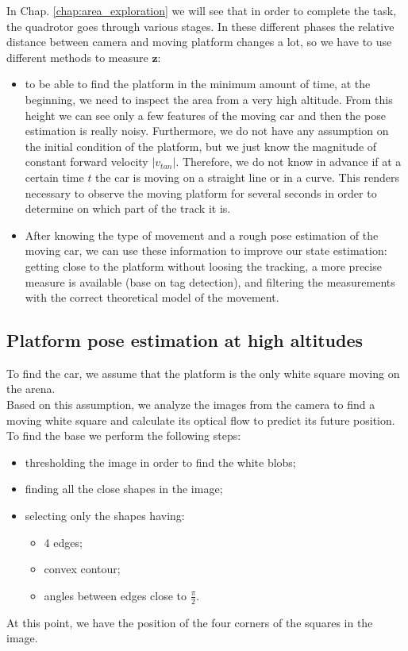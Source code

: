 In Chap. \ref{chap:area_exploration} we will see that in order to complete the task, the quadrotor goes through various stages. In these different phases the relative distance between camera and moving platform changes a lot, so we have to use different methods to measure $\boldsymbol{z}$:
\begin{itemize}
\item to be able to find the platform in the minimum amount of time, at the beginning, we need to inspect the area from a very high altitude. From this height we can see only a few features of the moving car and then the pose estimation is really noisy. Furthermore, we do not have any assumption on the initial condition of the platform, but we just know the magnitude of constant forward velocity $|v_{tan}|$. Therefore, we do not know in advance if at a certain time $t$ the car is moving on a straight line or in a curve. This renders necessary to observe the moving platform for several seconds in order to determine on which part of the track it is.
\item After knowing the type of movement and a rough pose estimation of the moving car, we can use these information to improve our state estimation: getting close to the platform without loosing the tracking, a more precise measure is available (base on tag detection), and filtering the measurements with the correct theoretical model of the movement.
\end{itemize}

\subsection{Platform pose estimation at high altitudes}
To find the car, we assume that the platform is the only white square moving on the arena.\\
Based on this assumption, we analyze the images from the camera to find a moving white square and calculate its optical flow to predict its future position.\\
To find the base we perform the following steps:
\begin{itemize}
\item thresholding the image in order to find the white blobs;
\item finding all the close shapes in the image;
\item selecting only the shapes having:
\begin{itemize}
\item 4 edges;
\item convex contour;
\item angles between edges close to $\frac{\pi}{2}$.
\end{itemize}
\end{itemize}
At this point, we have the position of the four corners of the squares in the image.\\

